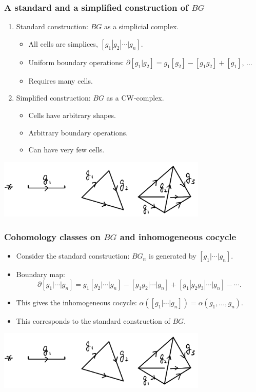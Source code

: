 \documentclass[xcolor=table, aspectratio=43,ignorenonframetext]{beamer}
\begin{document}
\begin{frame}
	\frametitle{A standard and a simplified construction of $BG$}
	\begin{enumerate}
		\item Standard construction: $BG$ as a simplicial complex.
		\begin{itemize}
			\item All cells are simplices, $[g_1|g_2|\cdots|g_n]$.
			\item Uniform boundary operations:
			$\partial[g_1|g_2]=g_1[g_2]-[g_1g_2]+[g_1]$, ...
			\item Requires many cells.
		\end{itemize}
		\item Simplified construction: $BG$ as a CW-complex.
		\begin{itemize}
			\item Cells have arbitrary shapes.
			\item Arbitrary boundary operations.
			\item Can have very few cells.
		\end{itemize}
	\end{enumerate}
	\begin{center}
		\includegraphics[width=10cm]{../chainmap/bg-std}
	\end{center}
\end{frame}


\begin{frame}
	\frametitle{Cohomology classes on $BG$ and inhomogeneous cocycle}
	\begin{itemize}
		\item Consider the standard construction:
		$BG_n$ is generated by $[g_1|\cdots|g_n]$.
		\item Boundary map:
		\[\partial[g_1|\cdots|g_n]=g_1[g_2|\cdots|g_n]
		-[g_1g_2|\cdots|g_n]+[g_1|g_2g_3|\cdots|g_n]-\cdots.\]
		\item This gives the inhomogeneous cocycle:
		$\alpha([g_1|\cdots|g_n])=\alpha(g_1,\ldots,g_n)$.
		\item This corresponds to the standard construction of $BG$.
	\end{itemize}
\begin{center}
	\includegraphics[width=10cm]{../chainmap/bg-std}
\end{center}
\end{frame}
\end{document}
